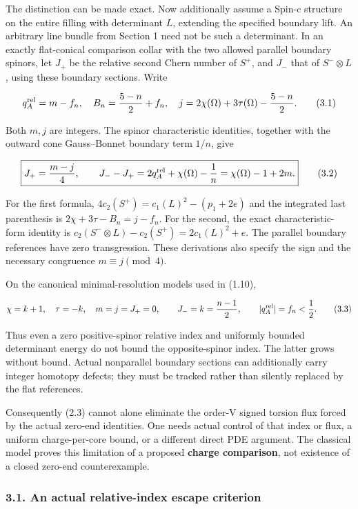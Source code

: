 \documentclass[
  10pt,
]{article}
\begin{document}
The distinction can be made exact. Now additionally assume a Spin-c
structure on the entire filling with determinant \(L\), extending the
specified boundary lift. An arbitrary line bundle from Section 1 need
not be such a determinant. In an exactly flat-conical comparison collar
with the two allowed parallel boundary spinors, let \(J_+\) be the
relative second Chern number of \(S^+\), and \(J_-\) that of
\(S^-\otimes L\), using these boundary sections. Write

\[
 q_A^{\rm rel}=m-f_n,\quad
 B_n=\frac{5-n}{2}+f_n,\quad
 j=2\chi(\Omega)+3\tau(\Omega)-\frac{5-n}{2}.
 \tag{3.1}
\]

Both \(m,j\) are integers. The spinor characteristic identities,
together with the outward cone Gauss--Bonnet boundary term \(1/n\), give

\[
 \boxed{J_+=\frac{m-j}{4},\qquad
        J_--J_+=2q_A^{\rm rel}+\chi(\Omega)-\frac1n
                    =\chi(\Omega)-1+2m.}
 \tag{3.2}
\]

For the first formula, \(4c_2(S^+)=c_1(L)^2-(p_1+2e)\) and the
integrated last parenthesis is \(2\chi+3\tau-B_n=j-f_n\). For the
second, the exact characteristic-form identity is
\(c_2(S^-\otimes L)-c_2(S^+)=2c_1(L)^2+e\). The parallel boundary
references have zero transgression. These derivations also specify the
sign and the necessary congruence \(m\equiv j\pmod4\).

On the canonical minimal-resolution models used in (1.10),

\[
 \chi=k+1,\quad\tau=-k,\quad m=j=J_+=0,
 \qquad J_-=k=\frac{n-1}{2},\qquad
 |q_A^{\rm rel}|=f_n<\frac12.
 \tag{3.3}
\]

Thus even a zero positive-spinor relative index and uniformly bounded
determinant energy do not bound the opposite-spinor index. The latter
grows without bound. Actual nonparallel boundary sections can
additionally carry integer homotopy defects; they must be tracked rather
than silently replaced by the flat references.

Consequently (2.3) cannot alone eliminate the order-V signed torsion
flux forced by the actual zero-end identities. One needs actual control
of that index or flux, a uniform charge-per-core bound, or a different
direct PDE argument. The classical model proves this limitation of a
proposed \textbf{charge comparison}, not existence of a closed zero-end
counterexample.

\hypertarget{an-actual-relative-index-escape-criterion}{%
\subsubsection{3.1. An actual relative-index escape
criterion}\label{an-actual-relative-index-escape-criterion}}
\end{document}
